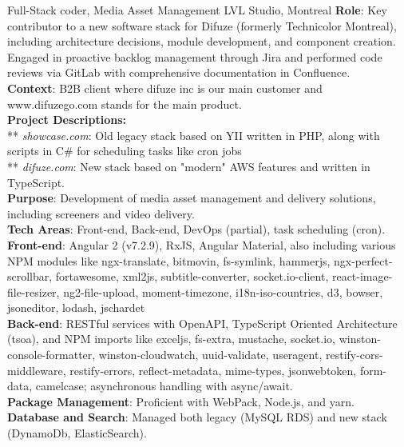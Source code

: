 \documentclass[
  a4paper,
   maincolor=cvblue,
   sectioncolor=cvblue,
]{fortysecondscv}
\begin{document}
\begin{cvtable}
    {Full-Stack coder, Media Asset Management}
    {LVL Studio, Montreal}
    {
      \textbf{Role}: Key contributor to a new software stack for Difuze (formerly Technicolor Montreal),
      including architecture decisions, module development, and component creation.
      Engaged in proactive backlog management through Jira and performed code reviews
      via GitLab with comprehensive documentation in Confluence.\\
      \textbf{Context}: B2B client where difuze inc is our main customer and www.difuzego.com stands for the main product.\\
      \textbf{Project Descriptions:}\\
         ** \textit{showcase.com}: Old legacy stack based on YII written in PHP, along with scripts in C\# for scheduling tasks like cron jobs\\
         ** \textit{difuze.com}: New stack based on "modern" AWS features and written in TypeScript.\\
      \textbf{Purpose}: Development of media asset management and delivery solutions, including screeners and video delivery.\\
      \textbf{Tech Areas}: Front-end, Back-end, DevOps (partial), task scheduling (cron).\\
      \textbf{Front-end}: Angular 2 (v7.2.9), RxJS, Angular Material, also including various NPM modules like ngx-translate, bitmovin, fs-symlink, hammerjs, ngx-perfect-scrollbar, fortawesome, xml2js, subtitle-converter, socket.io-client, react-image-file-resizer, ng2-file-upload, moment-timezone, i18n-iso-countries, d3, bowser, jsoneditor, lodash, jschardet\\
      \textbf{Back-end}: RESTful services with OpenAPI, TypeScript Oriented Architecture (tsoa), and NPM imports like exceljs, fs-extra, mustache, socket.io, winston-console-formatter, winston-cloudwatch, uuid-validate, useragent, restify-cors-middleware, restify-errors, reflect-metadata, mime-types, jsonwebtoken, form-data, camelcase; asynchronous handling with async/await.\\
      \textbf{Package Management}: Proficient with WebPack, Node.js, and yarn.\\
      \textbf{Database and Search}: Managed both legacy (MySQL RDS) and new stack (DynamoDb, ElasticSearch).\\
}
\end{cvtable}
\end{document}
